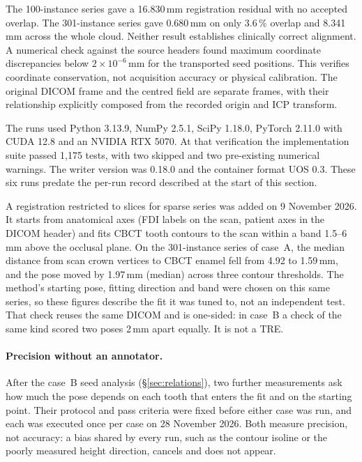 \documentclass[11pt,a4paper]{article}
\begin{document}
The 100-instance series gave a 16.830\,mm registration residual with no accepted overlap.
The 301-instance series gave 0.680\,mm on only 3.6\,\% overlap and 8.341\,mm across the
whole cloud. Neither result establishes clinically correct alignment. A numerical check
against the source headers found maximum coordinate discrepancies below
$2\times10^{-6}$\,mm for the transported seed positions. This verifies coordinate
conservation, not acquisition accuracy or physical calibration. The original DICOM frame
and the centred field are separate frames, with their relationship explicitly composed
from the recorded origin and ICP transform.

The runs used Python 3.13.9, NumPy 2.5.1, SciPy 1.18.0, PyTorch 2.11.0 with CUDA 12.8 and
an NVIDIA RTX 5070. At that verification the implementation suite passed 1{,}175 tests, with
two skipped and two pre-existing numerical warnings. The writer version was 0.18.0 and the
container format UOS 0.3. These six runs predate the per-run record described at the start
of this section.

A registration restricted to slices for sparse series was added on 9 November 2026. It
starts from anatomical axes (FDI labels on the scan, patient axes in the DICOM header) and
fits CBCT tooth contours to the scan within a band 1.5--6\,mm above the occlusal plane. On
the 301-instance series of case~A, the median distance from scan crown vertices to CBCT
enamel fell from 4.92 to 1.59\,mm, and the pose moved by 1.97\,mm (median) across three
contour thresholds. The method's starting pose, fitting direction and band were chosen on
this same series, so these figures describe the fit it was tuned to, not an independent test.
That check reuses the same DICOM and is one-sided: in case~B a check of
the same kind scored two poses 2\,mm apart equally. It is not a TRE.

\paragraph{Precision without an annotator.} After the case~B seed analysis
(\S\ref{sec:relations}), two further measurements ask how much the pose depends on each
tooth that enters the fit and on the starting point. Their protocol and
pass criteria were fixed before either case was run, and each was executed once per case on
28 November 2026. Both measure precision, not accuracy: a bias shared by every run, such as
the contour isoline or the poorly measured height direction, cancels and does not appear.
\end{document}
